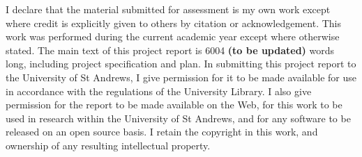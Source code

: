 I declare that the material submitted for assessment is my own work except where credit is explicitly given to others by citation or acknowledgement. This work was performed during the current academic year except where otherwise stated. The main text of this project report is 6004 \textbf{(to be updated)} words long, including project specification and plan. In submitting this project report to the University of St Andrews, I give permission for it to be made available for use in accordance with the regulations of the University Library. I also give permission for the report to be made available on the Web, for this work to be used in research within the University of St Andrews, and for any software to be released on an open source basis. I retain the copyright in this work, and ownership of any resulting intellectual property.
